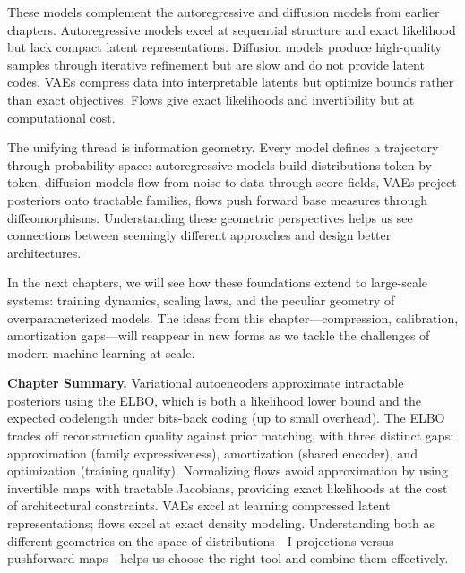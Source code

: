 These models complement the autoregressive and diffusion models from earlier chapters. Autoregressive models excel at sequential structure and exact likelihood but lack compact latent representations. Diffusion models produce high-quality samples through iterative refinement but are slow and do not provide latent codes. VAEs compress data into interpretable latents but optimize bounds rather than exact objectives. Flows give exact likelihoods and invertibility but at computational cost.

\vspace{0.3cm}

The unifying thread is information geometry. Every model defines a trajectory through probability space: autoregressive models build distributions token by token, diffusion models flow from noise to data through score fields, VAEs project posteriors onto tractable families, flows push forward base measures through diffeomorphisms. Understanding these geometric perspectives helps us see connections between seemingly different approaches and design better architectures.

\vspace{0.3cm}

In the next chapters, we will see how these foundations extend to large-scale systems: training dynamics, scaling laws, and the peculiar geometry of overparameterized models. The ideas from this chapter---compression, calibration, amortization gaps---will reappear in new forms as we tackle the challenges of modern machine learning at scale.

\vspace{1em}

\begin{pausebox}
\textbf{Chapter Summary.} Variational autoencoders approximate intractable posteriors using the ELBO, which is both a likelihood lower bound and the expected codelength under bits-back coding (up to small overhead). The ELBO trades off reconstruction quality against prior matching, with three distinct gaps: approximation (family expressiveness), amortization (shared encoder), and optimization (training quality). Normalizing flows avoid approximation by using invertible maps with tractable Jacobians, providing exact likelihoods at the cost of architectural constraints. VAEs excel at learning compressed latent representations; flows excel at exact density modeling. Understanding both as different geometries on the space of distributions---I-projections versus pushforward maps---helps us choose the right tool and combine them effectively.
\end{pausebox}

